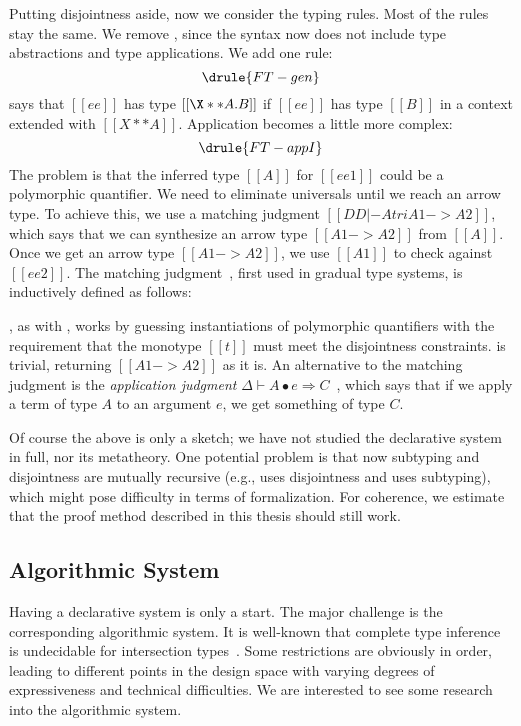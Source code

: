 Putting disjointness aside, now we consider the typing rules. Most of the rules
stay the same. We remove , since the syntax now does not
include type abstractions and type applications. We add one rule:
\[
  \drule{FT-gen}
\]
 says that $[[ee]]$ has type $[[\X ** A . B]]$ if $[[ee]]$ has type $[[B]]$ in a context extended with $[[ X ** A  ]]$.
Application becomes a little more complex:
\[
  \drule{FT-appI}
\]
The problem is that the inferred type $[[A]]$ for $[[ee1]]$ could be a
polymorphic quantifier.
We need to eliminate universals until we
reach an arrow type. To achieve this, we use a matching judgment $[[DD |- A tri A1 -> A2]]$,
which says that we can synthesize an arrow type $[[A1 -> A2]]$ from $[[A]]$.
Once we get an arrow type $[[A1 -> A2]]$, we use $[[A1]]$ to check against $[[ee2]]$.
The matching judgment~\citep{siek2015refined, xie2018consistent}, first used in gradual type systems, is inductively defined as follows:
\begin{mathpar}
\end{mathpar}
, as with , works by guessing instantiations of
polymorphic quantifiers with the requirement that the monotype $[[t]]$ must meet
the disjointness constraints.  is trivial, returning $[[A1 -> A2]]$
as it is. An alternative to the matching judgment is the \emph{application judgment}
$\Delta \vdash A \bullet e \Rightarrow C$~\citep{dunfield2013complete}, which says that if we apply a term of type $A$
to an argument $e$, we get something of type $C$.




Of course the above is only a sketch; we have not studied the declarative system in full,
nor its metatheory. One potential problem is that now subtyping and
disjointness are mutually recursive (e.g.,  uses disjointness and
 uses subtyping), which might pose difficulty in terms of
formalization. For coherence, we estimate that the proof method described in
this thesis should still work.



\subsection{Algorithmic System}

Having a declarative system is only a start. The major challenge is the
corresponding algorithmic system. It is well-known that complete type inference is
undecidable for intersection types~\citep{coppo1981functional, Barendregt_1983}. Some restrictions are obviously in order,
leading to different points in the design space with varying degrees of
expressiveness and technical difficulties. We are interested to see some
research into the algorithmic system.


